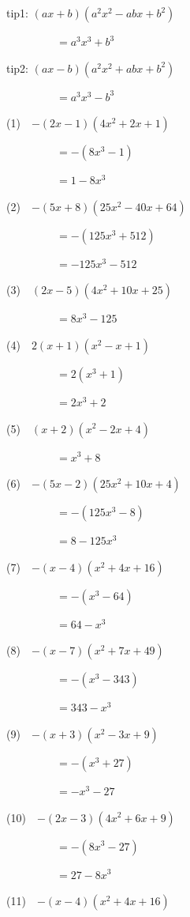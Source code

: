 \documentclass[a4j,twocolumn,10pt,fleqn]{jarticle}
\begin{document}
tip1: $\left(a x + b\right) \left(a^{2} x^{2} - a b x + b^{2}\right)$

~~~~~~~~~$=a^{3} x^{3} + b^{3}$


tip2: $\left(a x - b\right) \left(a^{2} x^{2} + a b x + b^{2}\right)$

~~~~~~~~~$=a^{3} x^{3} - b^{3}$


(1)~~$-\left(2 x - 1\right) \left(4 x^{2} + 2 x + 1\right)$

~~~~~~~~~$=-(8 x^{3} - 1)$

~~~~~~~~~$=1 - 8 x^{3}$

(2)~~$-\left(5 x + 8\right) \left(25 x^{2} - 40 x + 64\right)$

~~~~~~~~~$=-(125 x^{3} + 512)$

~~~~~~~~~$=- 125 x^{3} - 512$

(3)~~$\left(2 x - 5\right) \left(4 x^{2} + 10 x + 25\right)$

~~~~~~~~~$=8 x^{3} - 125$

(4)~~$2\left(x + 1\right) \left(x^{2} - x + 1\right)$

~~~~~~~~~$=2(x^{3} + 1)$

~~~~~~~~~$=2 x^{3} + 2$

(5)~~$\left(x + 2\right) \left(x^{2} - 2 x + 4\right)$

~~~~~~~~~$=x^{3} + 8$

(6)~~$-\left(5 x - 2\right) \left(25 x^{2} + 10 x + 4\right)$

~~~~~~~~~$=-(125 x^{3} - 8)$

~~~~~~~~~$=8 - 125 x^{3}$

(7)~~$-\left(x - 4\right) \left(x^{2} + 4 x + 16\right)$

~~~~~~~~~$=-(x^{3} - 64)$

~~~~~~~~~$=64 - x^{3}$

(8)~~$-\left(x - 7\right) \left(x^{2} + 7 x + 49\right)$

~~~~~~~~~$=-(x^{3} - 343)$

~~~~~~~~~$=343 - x^{3}$

(9)~~$-\left(x + 3\right) \left(x^{2} - 3 x + 9\right)$

~~~~~~~~~$=-(x^{3} + 27)$

~~~~~~~~~$=- x^{3} - 27$

(10)~~$-\left(2 x - 3\right) \left(4 x^{2} + 6 x + 9\right)$

~~~~~~~~~$=-(8 x^{3} - 27)$

~~~~~~~~~$=27 - 8 x^{3}$

(11)~~$-\left(x - 4\right) \left(x^{2} + 4 x + 16\right)$
\end{document}
